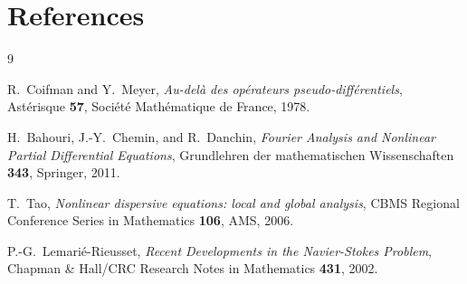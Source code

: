\documentclass[11pt]{article}
\theoremstyle{definition}
\begin{document}
\section*{References}

\begin{thebibliography}{9}

R.~Coifman and Y.~Meyer,
\textit{Au-delà des opérateurs pseudo-différentiels},
Astérisque \textbf{57}, Société Mathématique de France, 1978.

H.~Bahouri, J.-Y.~Chemin, and R.~Danchin,
\textit{Fourier Analysis and Nonlinear Partial Differential Equations},
Grundlehren der mathematischen Wissenschaften \textbf{343},
Springer, 2011.

T.~Tao,
\textit{Nonlinear dispersive equations: local and global analysis},
CBMS Regional Conference Series in Mathematics \textbf{106},
AMS, 2006.

P.-G.~Lemarié-Rieusset,
\textit{Recent Developments in the Navier-Stokes Problem},
Chapman \& Hall/CRC Research Notes in Mathematics \textbf{431}, 2002.

\end{thebibliography}
\end{document}

